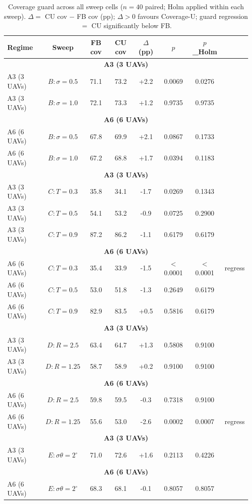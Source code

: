 \documentclass[journal]{IEEEtran}
\newcommand{\CU}{Coverage-U}
\begin{document}
\begin{table}[t]
\caption{Coverage guard across all sweep cells ($n = 40$ paired; Holm applied within each sweep). $\Delta =$ CU cov $-$ FB cov (pp); $\Delta > 0$ favours \CU; guard regression $=$ CU significantly below FB.}
\label{tab:guard}
\centering
\begin{tabular}{l c c c c c c c}
\toprule
Regime & Sweep & FB cov & CU cov & $\Delta$ (pp) & $p$ & $p$\_Holm &  \\
\midrule
\multicolumn{8}{c}{\textbf{A3 (3 UAVs)}} \\
\midrule
A3 (3 UAVs) & $B{:}\sigma{=}0.5$ & 71.1 & 73.2 & +2.2 & 0.0069 & 0.0276 &  \\
A3 (3 UAVs) & $B{:}\sigma{=}1.0$ & 72.1 & 73.3 & +1.2 & 0.9735 & 0.9735 &  \\
\multicolumn{8}{c}{\textbf{A6 (6 UAVs)}} \\
\midrule
A6 (6 UAVs) & $B{:}\sigma{=}0.5$ & 67.8 & 69.9 & +2.1 & 0.0867 & 0.1733 &  \\
A6 (6 UAVs) & $B{:}\sigma{=}1.0$ & 67.2 & 68.8 & +1.7 & 0.0394 & 0.1183 &  \\
\multicolumn{8}{c}{\textbf{A3 (3 UAVs)}} \\
\midrule
A3 (3 UAVs) & $C{:}T{=}0.3$ & 35.8 & 34.1 & -1.7 & 0.0269 & 0.1343 &  \\
A3 (3 UAVs) & $C{:}T{=}0.5$ & 54.1 & 53.2 & -0.9 & 0.0725 & 0.2900 &  \\
A3 (3 UAVs) & $C{:}T{=}0.9$ & 87.2 & 86.2 & -1.1 & 0.6179 & 0.6179 &  \\
\multicolumn{8}{c}{\textbf{A6 (6 UAVs)}} \\
\midrule
A6 (6 UAVs) & $C{:}T{=}0.3$ & 35.4 & 33.9 & -1.5 & $<$0.0001 & $<$0.0001 & regress \\
A6 (6 UAVs) & $C{:}T{=}0.5$ & 53.0 & 51.8 & -1.3 & 0.2649 & 0.6179 &  \\
A6 (6 UAVs) & $C{:}T{=}0.9$ & 82.9 & 83.5 & +0.5 & 0.5816 & 0.6179 &  \\
\multicolumn{8}{c}{\textbf{A3 (3 UAVs)}} \\
\midrule
A3 (3 UAVs) & $D{:}R{=}2.5$ & 63.4 & 64.7 & +1.3 & 0.5808 & 0.9100 &  \\
A3 (3 UAVs) & $D{:}R{=}1.25$ & 58.7 & 58.9 & +0.2 & 0.9100 & 0.9100 &  \\
\multicolumn{8}{c}{\textbf{A6 (6 UAVs)}} \\
\midrule
A6 (6 UAVs) & $D{:}R{=}2.5$ & 59.8 & 59.5 & -0.3 & 0.7318 & 0.9100 &  \\
A6 (6 UAVs) & $D{:}R{=}1.25$ & 55.6 & 53.0 & -2.6 & 0.0002 & 0.0007 & regress \\
\multicolumn{8}{c}{\textbf{A3 (3 UAVs)}} \\
\midrule
A3 (3 UAVs) & $E{:}\sigma\theta{=}2^\circ$ & 71.0 & 72.6 & +1.6 & 0.2113 & 0.4226 &  \\
\multicolumn{8}{c}{\textbf{A6 (6 UAVs)}} \\
\midrule
A6 (6 UAVs) & $E{:}\sigma\theta{=}2^\circ$ & 68.3 & 68.1 & -0.1 & 0.8057 & 0.8057 &  \\
\bottomrule
\end{tabular}
\end{table}
\end{document}
